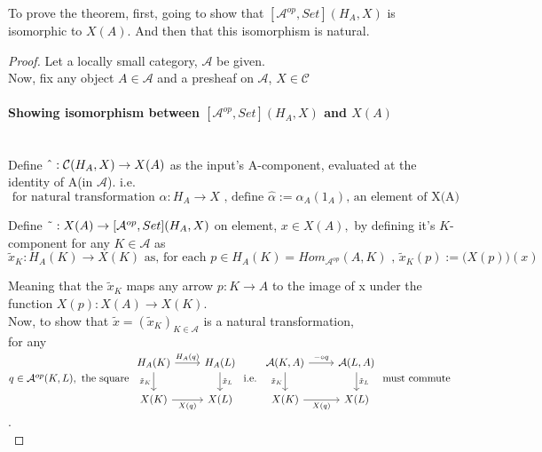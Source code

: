 \documentclass[18pt,a4paper]{article}
\theoremstyle{definition}
\begin{document}
To prove the theorem, first,
going to show that $[ \mathcal{A} ^{op}, Set](H_A,X)$ is isomorphic to $X(A)$. And then that
this isomorphism is natural.

\begin{proof}Let a locally small category,  $\mathcal{A} $ be given. \\
	Now, fix any object $A \in \mathcal{A} $ and a presheaf on $\mathcal{A}$,
	$X \in \mathcal{C}$

	\paragraph{Showing isomorphism between $[\mathcal{A}^{op},Set](H_A,X)$ and $X(A)$}\mbox{} \\

	Define $\string ^ :\mathcal{C}(H_A,X) \to X(A) $
	as the input's A-component, evaluated at the identity of A(in $\mathcal{A}$). i.e.\\
	\[  \text{ for natural transformation } \alpha:H_A \to X\text{ , define  }
	\hat{\alpha}:= \alpha_A(1_A) \text{, an element of X(A) } \]

	Define $\string ~ : X(A) \to [\mathcal{A}^{op}, Set](H_A,X)$ on element, $ x \in X(A), $
	by defining it's $K$-component for any $K \in \mathcal{A} $ as
	\[\tilde{x}_K : H_A(K) \to X(K)
		\text{ as, for each } p\in H_A(K)=\textit{Hom}_{\mathcal{A}^{op}}(A,K) \text{ , }
	\tilde{x}_K (p):=\Big(X(p)\Big)(x) \]

	Meaning that the $\tilde{x}_K$  maps any arrow $p:K \to A$
	to the image of x under the function $X(p):X(A)\to X(K)$.\\

	Now, to show that $\tilde{x}=(\tilde{x}_K)_{K\in \mathcal{A}} $ is a natural transformation,\\

	for any $q \in \mathcal{A}^{op}(K,L), \text{ the square }
	\begin{tikzcd}
		H_A(K) \arrow[swap]{d}{\tilde{x}_K} \arrow{r}{H_A(q)}
		& H_A(L) \arrow{d}{\tilde{x}_L}\\
		X(K) \arrow[swap]{r}{X(q)}
		& X(L)
	\end{tikzcd} \text{ i.e. }
	\begin{tikzcd}
		\mathcal{A}(K,A) \arrow[swap]{d}{\tilde{x}_K} \arrow{r}{ - \circ q}
		& \mathcal{A} (L,A) \arrow{d}{\tilde{x}_L}\\
		X(K) \arrow[swap]{r}{X(q)}
		& X(L)
	\end{tikzcd}\text{ must commute }$.\\


\end{proof}
\end{document}
